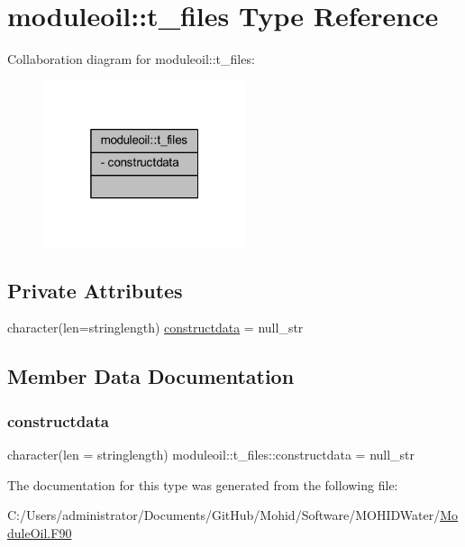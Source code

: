 \hypertarget{structmoduleoil_1_1t__files}{}\section{moduleoil\+:\+:t\+\_\+files Type Reference}
\label{structmoduleoil_1_1t__files}


Collaboration diagram for moduleoil\+:\+:t\+\_\+files\+:\nopagebreak
\begin{figure}[H]
\begin{center}
\leavevmode
\includegraphics[width=169pt]{structmoduleoil_1_1t__files__coll__graph}
\end{center}
\end{figure}
\subsection*{Private Attributes}
\begin{DoxyCompactItemize}
\item 
character(len=stringlength) \mbox{\hyperlink{structmoduleoil_1_1t__files_a5b195783820da1917420b40c6ba78338}{constructdata}} = null\+\_\+str
\end{DoxyCompactItemize}


\subsection{Member Data Documentation}
\mbox{\label{structmoduleoil_1_1t__files_a5b195783820da1917420b40c6ba78338}} 
\subsubsection{\texorpdfstring{constructdata}{constructdata}}
{\footnotesize\ttfamily character(len = stringlength) moduleoil\+::t\+\_\+files\+::constructdata = null\+\_\+str\hspace{0.3cm}{\ttfamily [private]}}



The documentation for this type was generated from the following file\+:\begin{DoxyCompactItemize}
\item 
C\+:/\+Users/administrator/\+Documents/\+Git\+Hub/\+Mohid/\+Software/\+M\+O\+H\+I\+D\+Water/\mbox{\hyperlink{_module_oil_8_f90}{Module\+Oil.\+F90}}\end{DoxyCompactItemize}
